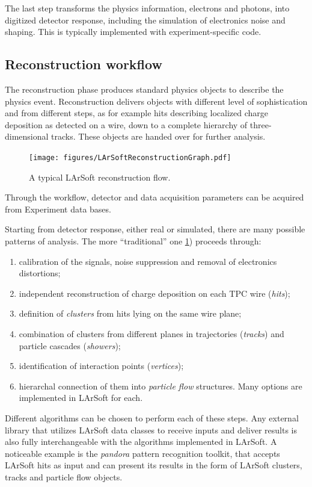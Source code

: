 The last step transforms the physics information, electrons and photons,
into digitized detector response, including the simulation of
electronics noise and shaping. This is typically implemented with
experiment-specific code.


\subsection{Reconstruction workflow}
\label{ssec:Workflows:Reconstruction}

The reconstruction phase produces standard physics objects to describe
the physics event. Reconstruction delivers objects with different level
of sophistication and from different steps, as for example hits
describing localized charge deposition as detected on a wire, down to a
complete hierarchy of three-dimensional tracks. These objects are handed
over for further analysis.
\begin{figure}[htbp]
  \centering
  \texttt{[image: figures/LArSoftReconstructionGraph.pdf]}
  \caption{\label{fig:LArSoftReconstruction}A typical LArSoft reconstruction flow.}
\end{figure}
Through the workflow, detector and data acquisition parameters
can be acquired from Experiment data bases.

Starting from detector response, either real or simulated, there are
many possible patterns of analysis. The more ``traditional'' one \cref{fig:LArSoftReconstruction}) proceeds through:
\begin{enumerate}
  \item calibration of the signals, noise suppression and removal of electronics distortions;
  \item independent reconstruction of charge deposition on each TPC wire (\emph{hits});
  \item definition of \emph{clusters} from hits lying on the same wire plane;
  \item combination of clusters from different planes in trajectories (\emph{tracks}) and particle cascades (\emph{showers});
  \item identification of interaction points (\emph{vertices});
  \item hierarchal connection of them into \emph{particle flow} structures. Many options are implemented in LArSoft for each.
\end{enumerate}
Different algorithms can be chosen to perform each of these steps.
Any external library that utilizes LArSoft data classes to receive
inputs and deliver results is also fully interchangeable with the
algorithms implemented in LArSoft. A noticeable example is the
\emph{pandora} pattern recognition toolkit, that accepts LArSoft hits as
input and can present its results in the form of LArSoft clusters,
tracks and particle flow objects.

